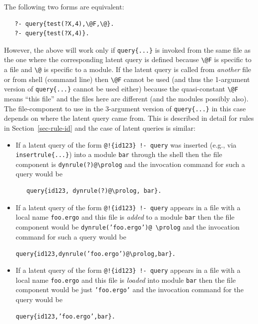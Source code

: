\documentclass[11pt]{article}
\newcommand{\ERGO}{\mbox{\smaller{\ensuremath{\cal{E}}\smaller{{\sc{RGO}}}}}\xspace}
\newcommand{\FLSYSTEM}{\ERGO}
\newcommand{\ergoext}{ergo\xspace}
\newcommand{\bs}{\textbackslash}
\begin{document}
The following two forms are equivalent:
\begin{verbatim}
   ?- query{test(?X,4),\@F,\@}.
   ?- query{test(?X,4)}.
\end{verbatim}
However, the above will work only if \texttt{query\{...\}} is invoked from
the same file as the one where the corresponding latent query is defined
because \texttt{\bs{}@F} is specific to a file and \texttt{\bs{}@} is
specific to a module.
If the latent query is called from
\emph{another} file or from \FLSYSTEM shell (command line) then \texttt{\bs{}@F}
cannot be used (and thus the 1-argument version of \texttt{query\{...\}}
cannot be used either) because the quasi-constant
\texttt{\bs{}@F} means ``this file'' and the
files here are different (and the modules possibly also).
The file-component to use in the 3-argument version of
\texttt{query\{...\}} in this case depends on where the latent query came from.
This is described in detail for rules in Section~\ref{sec-rule-id}
and the case of latent queries is similar:
\begin{itemize}
\item  If a latent query of the form \texttt{@!\{id123\} !- query} 
  was inserted (e.g., via \texttt{insertrule\{...\}}) into a module
  \texttt{bar} 
  through the \FLSYSTEM shell then the file component is
  \texttt{dynrule(?)@\bs{}prolog} and the invocation command for such a query
  would be
\begin{verbatim}
   query{id123, dynrule(?)@\prolog, bar}.
\end{verbatim}
\item If a latent query of the form \texttt{@!\{id123\} !- query} appears in
  a file with a local name \texttt{foo.\ergoext} and this file is
  \emph{added} to a module \texttt{bar} then the file component would be
  \texttt{dynrule('foo.\ergoext')@ \bs{}prolog} and the invocation command
  for such a query would be
\begin{alltt}
    query\{id123, dynrule('foo.\ergoext')@\bs{}prolog, bar\}.
\end{alltt}
  \item If a latent query of the form \texttt{@!\{id123\} !- query} appears in
  a file with a local name \texttt{foo.\ergoext} and this file is
  \emph{loaded} into module \texttt{bar} then the file component would be
  just \texttt{'foo.\ergoext'} and the invocation command
  for the query would be
\begin{alltt}
    query\{id123, 'foo.\ergoext', bar\}.
\end{alltt}
\end{itemize}
\end{document}
